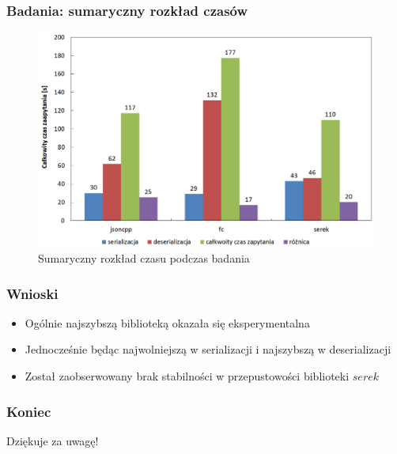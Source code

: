 \documentclass[12pt]{beamer}
\begin{document}
	\begin{frame}
		\frametitle{Badania: sumaryczny rozkład czasów}

		\begin{figure}[ht!]
			\centering
			\includegraphics[width=\framewidth, keepaspectratio=true]{../paper/charts/pre_generated_charts/total_serial_and_deserial_library_summmary.png}
			\caption{Sumaryczny rozkład czasu podczas badania}
		\end{figure}

	\end{frame}

	\begin{frame}
		\frametitle{Wnioski}

		\begin{itemize}
			\item Ogólnie najszybszą biblioteką okazała się eksperymentalna
			\item Jednocześnie będąc najwolniejszą w serializacji i najszybszą w deserializacji
			\item Został zaobserwowany brak stabilności w przepustowości biblioteki $serek$
		\end{itemize}

	\end{frame}

	\begin{frame}
		\frametitle{Koniec}

		\centering\Huge Dziękuje za uwagę!

	\end{frame}
\end{document}
